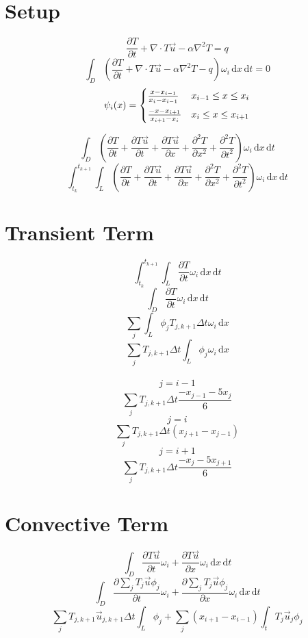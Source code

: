 \documentclass[12pt]{article}
\newcommand{\diff}[0]{\, \mathrm{d}}
\begin{document}
\section{Setup}
\[\frac{\partial T}{\partial t} + \nabla\cdot T \vec{u}-\alpha\nabla^2 T=q\]
\[\int_D (\frac{\partial T}{\partial t} + \nabla\cdot T \vec{u}-\alpha\nabla^2 T - q)\omega_i\diff x \diff t = 0\]
\vspace{3em}
\[\psi_i(x) = 
\begin{cases}
\frac{x-x_{i-1}}{x_{i}-x_{i-1}} & x_{i-1} \leq x \leq x_i
\vspace{1ex}\\
\frac{-x-x_{i+1}}{x_{i+1}-x_i} & x_i \leq x \leq x_{i+1}\\
\end{cases}\]

\[\int_D (\frac{\partial T}{\partial t} + \frac{\partial{T\vec{u}}}{\partial t}+\frac{\partial T\vec{u}}{\partial{x}}+\frac{\partial^2 T}{\partial x^2}+\frac{\partial^2 T}{\partial t^2})\omega_i \diff x \diff t\]
\[\int_{t_k}^{t_{k+1}}\int_L (\frac{\partial T}{\partial t} + \frac{\partial{T\vec{u}}}{\partial t}+\frac{\partial T\vec{u}}{\partial{x}}+\frac{\partial^2 T}{\partial x^2}+\frac{\partial^2 T}{\partial t^2})\omega_i \diff x \diff t\]

\section{Transient Term}
\[\int_{t_k}^{t_{k+1}}\int_L \frac{\partial T}{\partial t} \omega_i \diff x \diff t \]
\[\int_D \frac{\partial T}{\partial t}\omega_i\diff x \diff t\]
\[\sum\limits_j\int_L \phi_jT_{j,k+1}\Delta t \omega_i\diff x\]
\[\sum\limits_jT_{j,k+1}\Delta t \int_L \phi_j\omega_i\diff x\]
\\
\[j=i-1\]
\[\sum\limits_j T_{j,k+1} \Delta t \frac{-x_{j-1}-5x_j}{6}\]
\[j=i\]
\[\sum\limits_jT_{j,k+1}\Delta t (x_{j+1}-x_{j-1})\]
\[j=i+1\]
\[\sum\limits_j T_{j,k+1} \Delta t \frac{-x_j-5x_{j+1}}{6}\]
\section{Convective Term}
\[\int_D \frac{\partial{T\vec{u}}}{\partial t}\omega_i+\frac{\partial T\vec{u}}{\partial x}\omega_i \diff x \diff t \]
\[\int_D \frac{\partial\sum\limits_j T_j\vec{u}\phi_j}{\partial t}\omega_i + \frac{\partial\sum\limits_j T_j\vec{u}\phi_j}{\partial x}\omega_i \diff x \diff t\]
\[\sum\limits_j T_{j,k+1} \vec{u}_{j,k+1} \Delta t \int_L  \phi_j+ \sum_j (x_{i+1}-x_{i-1})\int_t  T_j\vec{u}_j\phi_j \]
\end{document}
